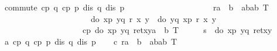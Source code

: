 \begin{isabellebody}
\begin{isamarkuptext}
\end{isamarkuptext}%
\isamarkuptrue%
\ commute{\isacharunderscore}{}{\isacharunderscore}{}{\isacharcolon}\ {\isachardoublequote}{\isasymlbrakk}cp\ q{\isacharsemicolon}\ cp\ p{\isacharsemicolon}\ dis\ q{\isacharsemicolon}\ dis\ p{\isasymrbrakk}\ {\isasymLongrightarrow}\isanewline
\ \ \ \ \ \ \ \ \ \ \ \ \ \ \ \ \ \ \ \ {\isasymforall}r{\isacharcolon}{\isacharcolon}{\isacharprime}a\ {\isasymRightarrow}\ {\isacharprime}b\ {\isasymRightarrow}\ {\isacharparenleft}{\isacharparenleft}{\isacharprime}a{\isacharasterisk}{\isacharprime}b{\isacharparenright}{\isacharasterisk}{\isacharparenleft}{\isacharprime}a{\isacharasterisk}{\isacharprime}b{\isacharparenright}{\isacharparenright}\ T{\isachardot}\isanewline
\ \ \ \ \ \ \ \ \ \ \ \ \ \ \ \ \ \ \ \ \ \ do\ {\isacharbraceleft}x{\isasymleftarrow}p{\isacharsemicolon}\ y{\isasymleftarrow}q{\isacharsemicolon}\ r\ x\ y{\isacharbraceright}\ {\isacharequal}\ do\ {\isacharbraceleft}y{\isasymleftarrow}q{\isacharsemicolon}\ x{\isasymleftarrow}p{\isacharsemicolon}\ r\ x\ y{\isacharbraceright}\ {\isasymLongrightarrow}\isanewline
\ \ \ \ \ \ \ \ \ \ \ \ \ \ \ \ \ \ \ \ cp\ {\isacharparenleft}do\ {\isacharbraceleft}x{\isasymleftarrow}p{\isacharsemicolon}\ y{\isasymleftarrow}q{\isacharsemicolon}\ ret{\isacharparenleft}x{\isacharcomma}y{\isacharparenright}{\isacharcolon}{\isacharcolon}{\isacharparenleft}{\isacharprime}a\ {\isacharasterisk}\ {\isacharprime}b{\isacharparenright}\ T{\isacharbraceright}{\isacharparenright}{\isachardoublequote}\isanewline
\isamarkupfalse%
\ {\isacharminus}\isanewline
\ \ \isamarkupfalse%
\ {\isacharquery}s\ {\isacharequal}\ {\isachardoublequote}do\ {\isacharbraceleft}x{\isasymleftarrow}p{\isacharsemicolon}\ y{\isasymleftarrow}q{\isacharsemicolon}\ ret{\isacharparenleft}x{\isacharcomma}y{\isacharparenright}{\isacharbraceright}{\isachardoublequote}\isanewline
\ \ \isamarkupfalse%
\ a{\isacharcolon}\ {\isachardoublequote}cp\ q{\isachardoublequote}\ {\isachardoublequote}cp\ p{\isachardoublequote}\ {\isachardoublequote}dis\ q{\isachardoublequote}\ {\isachardoublequote}dis\ p{\isachardoublequote}\isanewline
\ \ \isamarkupfalse%
\ c{\isacharcolon}\ {\isachardoublequote}{\isasymforall}r{\isacharcolon}{\isacharcolon}{\isacharprime}a\ {\isasymRightarrow}\ {\isacharprime}b\ {\isasymRightarrow}\ {\isacharparenleft}{\isacharparenleft}{\isacharprime}a{\isacharasterisk}{\isacharprime}b{\isacharparenright}{\isacharasterisk}{\isacharparenleft}{\isacharprime}a{\isacharasterisk}{\isacharprime}b{\isacharparenright}{\isacharparenright}\ T{\isachardot}\ \isanewline

\end{isabellebody}
